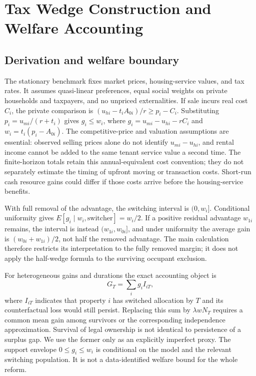 \section{Tax Wedge Construction and Welfare Accounting}\label{app:welfare}

\subsection{Derivation and welfare boundary}

The stationary benchmark fixes market prices, housing-service values, and
tax rates. It assumes quasi-linear preferences, equal social weights on
private households and taxpayers, and no unpriced externalities. If sale
incurs real cost $C_i$, the private comparison is
$(u_{hi}-t_iA_{0i})/r\geq p_i-C_i$. Substituting
$p_i=u_{mi}/(r+t_i)$ gives $g_i\leq w_i$, where
$g_i=u_{mi}-u_{hi}-rC_i$ and $w_i=t_i(p_i-A_{0i})$.
The competitive-price and valuation assumptions are essential: observed
selling prices alone do not identify $u_{mi}-u_{hi}$, and rental income
cannot be added to the same tenant service value a second time.
The finite-horizon totals retain this annual-equivalent cost convention;
they do not separately estimate the timing of upfront moving or transaction
costs. Short-run cash resource gains could differ if those costs arrive
before the housing-service benefits.

With full removal of the advantage, the switching interval is $(0,w_i]$.
Conditional uniformity gives $E[g_i\mid w_i,\text{switcher}]=w_i/2$.
If a positive residual advantage $w_{1i}$ remains, the interval is instead
$(w_{1i},w_{0i}]$, and under uniformity the average gain is
$(w_{0i}+w_{1i})/2$, not half the removed advantage. The main calculation
therefore restricts its interpretation to the fully removed margin; it
does not apply the half-wedge formula to the surviving occupant exclusion.

For heterogeneous gains and durations the exact accounting object is
\[
 G_T=\sum_i g_i I_{iT},
\]
where $I_{iT}$ indicates that property $i$ has switched allocation by $T$
and its counterfactual loss would still persist.
Replacing this sum by $\lambda w N_T$ requires a common mean gain among
survivors or the corresponding independence approximation. Survival of
legal ownership is not identical to persistence of a surplus gap. We use
the former only as an explicitly imperfect proxy. The support envelope
$0\leq g_i\leq w_i$ is conditional on the model and the relevant switching
population. It is not a data-identified welfare bound for the whole reform.

